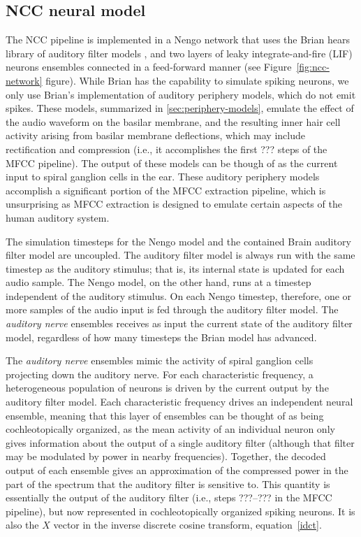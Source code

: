 \subsection{NCC neural model}
\label{sec:ncc-neural}

The NCC pipeline is implemented
in a Nengo network that uses
the Brian hears library
of auditory filter models
\cite{fontaine2011},
and two layers of
leaky integrate-and-fire (LIF) neurons ensembles
connected in a feed-forward manner
(see Figure~\ref{fig:ncc-network} figure).
While Brian has the capability
to simulate spiking neurons,
we only use Brian's implementation of
auditory periphery models,
which do not emit spikes.
These models,
summarized in \ref{sec:periphery-models},
emulate the effect of the
audio waveform on the basilar membrane,
and the resulting inner hair cell activity
arising from basilar membrane deflections,
which may include rectification
and compression
(i.e., it accomplishes the first
??? steps of the MFCC pipeline).
The output of these models
can be though of as
the current input
to spiral ganglion cells in the ear.
These auditory periphery models
accomplish a significant portion
of the MFCC extraction pipeline,
which is unsurprising as MFCC extraction
is designed to emulate certain aspects
of the human auditory system.


The simulation timesteps
for the Nengo model and the contained
Brain auditory filter model
are uncoupled.
The auditory filter model
is always run with the same timestep
as the auditory stimulus;
that is, its internal state is updated
for each audio sample.
The Nengo model, on the other hand,
runs at a timestep independent
of the auditory stimulus.
On each Nengo timestep,
therefore, one or more samples
of the audio input
is fed through the
auditory filter model.
The \textit{auditory nerve} ensembles
receives as input the current
state of the auditory filter model,
regardless of how many timesteps
the Brian model has advanced.

The \textit{auditory nerve} ensembles
mimic the activity of spiral ganglion cells
projecting down the auditory nerve.
For each characteristic frequency,
a heterogeneous population of neurons
is driven by the current output by
the auditory filter model.
Each characteristic frequency
drives an independent neural ensemble,
meaning that this layer of ensembles
can be thought of as being cochleotopically organized,
as the mean activity of an individual neuron
only gives information about the output
of a single auditory filter
(although that filter may be modulated
by power in nearby frequencies).
Together, the decoded output of
each ensemble gives an approximation of
the compressed power in the part of the spectrum
that the auditory filter is sensitive to.
This quantity is essentially
the output of the auditory filter
(i.e., steps ???--??? in the MFCC pipeline),
but now represented in
cochleotopically organized spiking neurons.
It is also the $X$ vector in
the inverse discrete cosine transform,
equation~\eqref{idct}.

